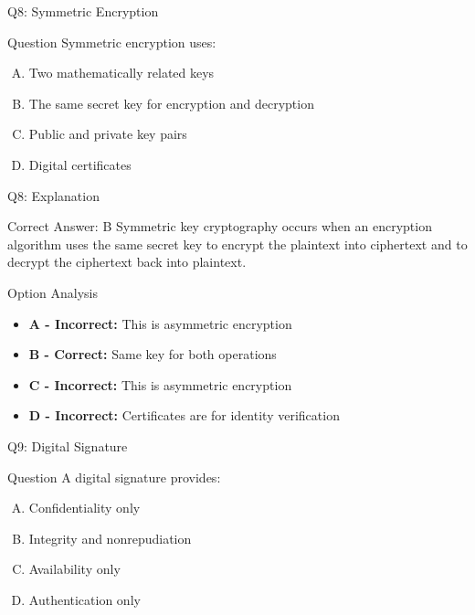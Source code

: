 \documentclass{beamer}
\begin{document}
	\begin{frame}{Q8: Symmetric Encryption}
		\begin{block}{Question}
			Symmetric encryption uses:
		\end{block}
		\begin{enumerate}[(A)]
			\item Two mathematically related keys
			\item The same secret key for encryption and decryption
			\item Public and private key pairs
			\item Digital certificates
		\end{enumerate}
	\end{frame}
	
	\begin{frame}{Q8: Explanation}
		\begin{block}{Correct Answer: B}
			Symmetric key cryptography occurs when an encryption algorithm uses the same secret key to encrypt the plaintext into ciphertext and to decrypt the ciphertext back into plaintext.
		\end{block}
		\begin{block}{Option Analysis}
			\begin{itemize}
				\item \textbf{A - Incorrect:} This is asymmetric encryption
				\item \textbf{B - Correct:} Same key for both operations
				\item \textbf{C - Incorrect:} This is asymmetric encryption
				\item \textbf{D - Incorrect:} Certificates are for identity verification
			\end{itemize}
		\end{block}
	\end{frame}
	
	\begin{frame}{Q9: Digital Signature}
		\begin{block}{Question}
			A digital signature provides:
		\end{block}
		\begin{enumerate}[(A)]
			\item Confidentiality only
			\item Integrity and nonrepudiation
			\item Availability only
			\item Authentication only
		\end{enumerate}
	\end{frame}
	
\end{document}
